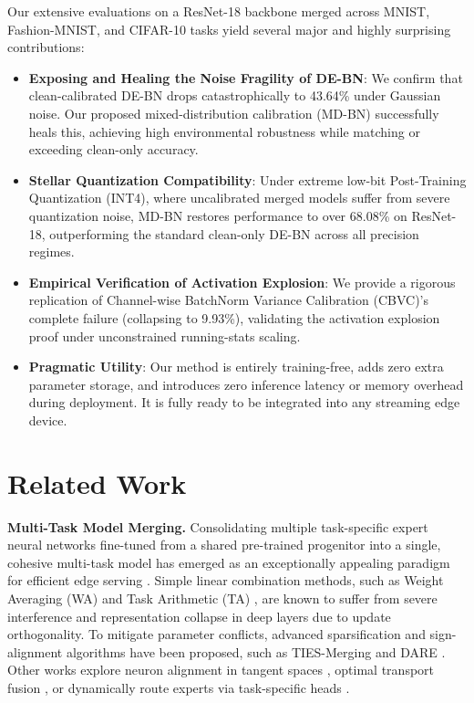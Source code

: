 \documentclass{article}
\theoremstyle{plain}
\theoremstyle{definition}
\theoremstyle{remark}
\begin{document}
Our extensive evaluations on a ResNet-18 backbone merged across MNIST, Fashion-MNIST, and CIFAR-10 tasks yield several major and highly surprising contributions:
\begin{itemize}
    \item \textbf{Exposing and Healing the Noise Fragility of DE-BN}: We confirm that clean-calibrated DE-BN drops catastrophically to 43.64\% under Gaussian noise. Our proposed mixed-distribution calibration (MD-BN) successfully heals this, achieving high environmental robustness while matching or exceeding clean-only accuracy.
    \item \textbf{Stellar Quantization Compatibility}: Under extreme low-bit Post-Training Quantization (INT4), where uncalibrated merged models suffer from severe quantization noise, MD-BN restores performance to over 68.08\% on ResNet-18, outperforming the standard clean-only DE-BN across all precision regimes.
    \item \textbf{Empirical Verification of Activation Explosion}: We provide a rigorous replication of Channel-wise BatchNorm Variance Calibration (CBVC)'s complete failure (collapsing to 9.93\%), validating the activation explosion proof under unconstrained running-stats scaling.
    \item \textbf{Pragmatic Utility}: Our method is entirely training-free, adds zero extra parameter storage, and introduces zero inference latency or memory overhead during deployment. It is fully ready to be integrated into any streaming edge device.
\end{itemize}

\section{Related Work}
\label{sec:related}
\textbf{Multi-Task Model Merging.} Consolidating multiple task-specific expert neural networks fine-tuned from a shared pre-trained progenitor into a single, cohesive multi-task model has emerged as an exceptionally appealing paradigm for efficient edge serving \cite{wortsman2022model}. Simple linear combination methods, such as Weight Averaging (WA) \cite{izmailov2018averaging} and Task Arithmetic (TA) \cite{ilharco2022editing}, are known to suffer from severe interference and representation collapse in deep layers due to update orthogonality. To mitigate parameter conflicts, advanced sparsification and sign-alignment algorithms have been proposed, such as TIES-Merging \cite{yadav2023ties} and DARE \cite{yu2024dare}. Other works explore neuron alignment in tangent spaces \cite{ainsworth2022git, stoica2023zipit}, optimal transport fusion \cite{pan2025merging, cui2026transport}, or dynamically route experts via task-specific heads \cite{daheim2024model_routing}.
\end{document}
